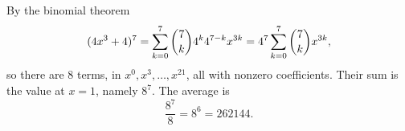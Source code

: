 By the binomial theorem
\[
(4x^3+4)^7=\sum_{k=0}^{7}\dbinom7k4^k4^{7-k}x^{3k}=4^7\sum_{k=0}^{7}\dbinom7kx^{3k},
\]
so there are $8$ terms, in $x^0,x^3,\dots,x^{21}$, all with nonzero coefficients. Their sum is the value at $x=1$, namely $8^7$. The average is
\[
\dfrac{8^7}{8}=8^6=\boxed{262144}.
\]
